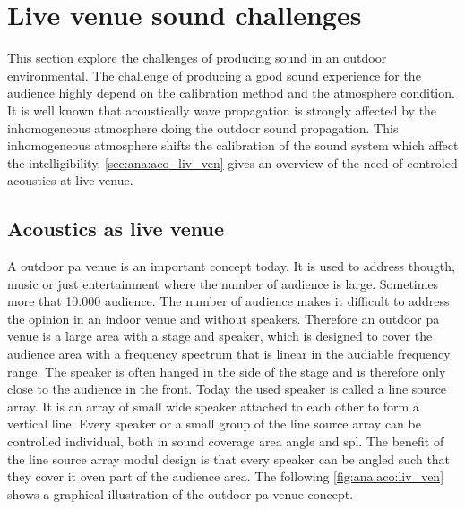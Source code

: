 \section{Live venue sound challenges}
This section explore the challenges of producing sound in an outdoor environmental. The challenge of producing a good sound experience for the audience highly depend on the calibration method and the atmosphere condition. It is well known that acoustically wave propagation is strongly affected by the inhomogeneous atmosphere doing the outdoor sound propagation. This inhomogeneous atmosphere shifts the calibration of the sound system which affect the intelligibility. \autoref{sec:ana:aco_liv_ven} gives an overview of the need of controled acoustics at live venue.


\subsection{Acoustics as live venue}\label{sec:ana:aco_liv_ven}
A outdoor \gls{pa} venue is an important concept today. It is used to address thougth, music or just entertainment where the number of audience is large. Sometimes more that 10.000 audience. The number of audience makes it difficult to address the opinion in an indoor venue and without speakers. Therefore an outdoor \gls{pa} venue is a large area with a stage and speaker, which is designed to cover the audience area with a frequency spectrum that is linear in the audiable frequency range. The speaker is often hanged in the side of the stage and is therefore only close to the audience in the front. Today the used speaker is called a line source array. It is an array of small wide speaker attached to each other to form a vertical line. Every speaker or a small group of the line source array can be controlled individual, both in sound coverage area angle and \gls{spl}. The benefit of the line source array modul design is that every speaker can be angled such that they cover it oven part of the audience area. The following \autoref{fig:ana:aco:liv_ven} shows a graphical illustration of the outdoor \gls{pa} venue concept.


